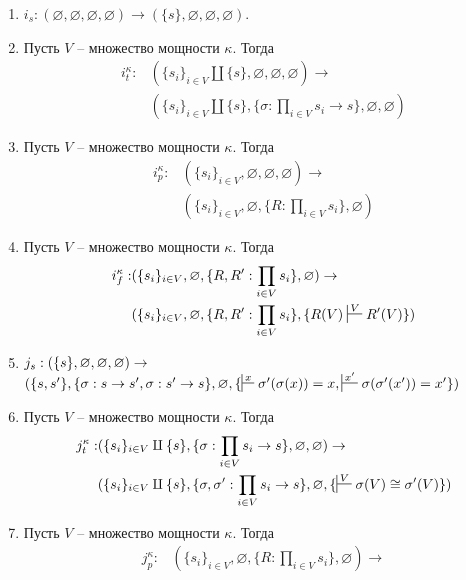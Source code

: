 \documentclass[reqno]{amsart}
\theoremstyle{definition}
\theoremstyle{remark}
\begin{document}
\begin{enumerate}
\item $i_s : (\varnothing,\varnothing,\varnothing,\varnothing) \to (\{ s \},\varnothing,\varnothing,\varnothing)$.
\item Пусть $V$ -- множество мощности $\kappa$. Тогда
\begin{align*}
i_t^\kappa : & (\{ s_i \}_{i \in V} \amalg \{ s \}, \varnothing, \varnothing, \varnothing) \to \\
             & (\{ s_i \}_{i \in V} \amalg \{ s \}, \{ \sigma : \prod_{i \in V} s_i \to s \}, \varnothing, \varnothing)
\end{align*}
\item Пусть $V$ -- множество мощности $\kappa$. Тогда
\begin{align*}
i_p^\kappa : & (\{ s_i \}_{i \in V}, \varnothing, \varnothing, \varnothing) \to \\
             & (\{ s_i \}_{i \in V}, \varnothing, \{ R : \prod_{i \in V} s_i \}, \varnothing)
\end{align*}
\item Пусть $V$ -- множество мощности $\kappa$. Тогда
\begin{align*}
i_f^\kappa : & (\{ s_i \}_{i \in V}, \varnothing, \{ R, R' : \prod_{i \in V} s_i \}, \varnothing) \to \\
             & (\{ s_i \}_{i \in V}, \varnothing, \{ R, R' : \prod_{i \in V} s_i \}, \{ R(V) \sststile{}{V} R'(V) \})
\end{align*}
\item $j_s : (\{ s \},\varnothing,\varnothing,\varnothing) \to \\$
$(\{ s, s' \}, \{ \sigma : s \to s', \sigma : s' \to s \}, \varnothing, \{ \sststile{}{x} \sigma'(\sigma(x)) = x, \sststile{}{x'} \sigma(\sigma'(x')) = x' \})$
\item Пусть $V$ -- множество мощности $\kappa$. Тогда
\begin{align*}
j_t^\kappa : & (\{ s_i \}_{i \in V} \amalg \{ s \}, \{ \sigma : \prod_{i \in V} s_i \to s \}, \varnothing, \varnothing) \to \\
             & (\{ s_i \}_{i \in V} \amalg \{ s \}, \{ \sigma, \sigma' : \prod_{i \in V} s_i \to s \}, \varnothing, \{ \sststile{}{V} \sigma(V) \cong \sigma'(V) \})
\end{align*}
\item Пусть $V$ -- множество мощности $\kappa$. Тогда
\begin{align*}
j_p^\kappa : & (\{ s_i \}_{i \in V}, \varnothing, \{ R : \prod_{i \in V} s_i \}, \varnothing) \to \\

\end{align*}
\end{enumerate}
\end{document}
